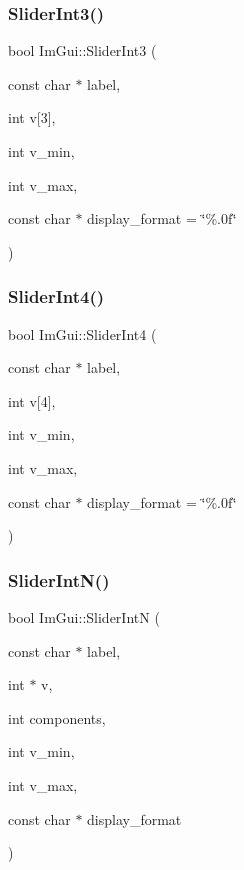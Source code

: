 \hypertarget{namespace_im_gui_a099188a7fdaad1a8103e6e24f41e1a8a}{}\label{namespace_im_gui_a099188a7fdaad1a8103e6e24f41e1a8a} 
\subsubsection{\texorpdfstring{Slider\+Int3()}{SliderInt3()}}
{\footnotesize\ttfamily bool Im\+Gui\+::\+Slider\+Int3 (\begin{DoxyParamCaption}\item[{const char $\ast$}]{label,  }\item[{int}]{v\mbox{[}3\mbox{]},  }\item[{int}]{v\+\_\+min,  }\item[{int}]{v\+\_\+max,  }\item[{const char $\ast$}]{display\+\_\+format = {\ttfamily \char`\"{}\%.0f\char`\"{}} }\end{DoxyParamCaption})}

\hypertarget{namespace_im_gui_a88c24aa0e5af4cbb14559b5789886810}{}\label{namespace_im_gui_a88c24aa0e5af4cbb14559b5789886810} 
\subsubsection{\texorpdfstring{Slider\+Int4()}{SliderInt4()}}
{\footnotesize\ttfamily bool Im\+Gui\+::\+Slider\+Int4 (\begin{DoxyParamCaption}\item[{const char $\ast$}]{label,  }\item[{int}]{v\mbox{[}4\mbox{]},  }\item[{int}]{v\+\_\+min,  }\item[{int}]{v\+\_\+max,  }\item[{const char $\ast$}]{display\+\_\+format = {\ttfamily \char`\"{}\%.0f\char`\"{}} }\end{DoxyParamCaption})}

\hypertarget{namespace_im_gui_a13fe35db80c7d1002c98fd5e8ea90239}{}\label{namespace_im_gui_a13fe35db80c7d1002c98fd5e8ea90239} 
\subsubsection{\texorpdfstring{Slider\+Int\+N()}{SliderIntN()}}
{\footnotesize\ttfamily bool Im\+Gui\+::\+Slider\+IntN (\begin{DoxyParamCaption}\item[{const char $\ast$}]{label,  }\item[{int $\ast$}]{v,  }\item[{int}]{components,  }\item[{int}]{v\+\_\+min,  }\item[{int}]{v\+\_\+max,  }\item[{const char $\ast$}]{display\+\_\+format }\end{DoxyParamCaption})}

